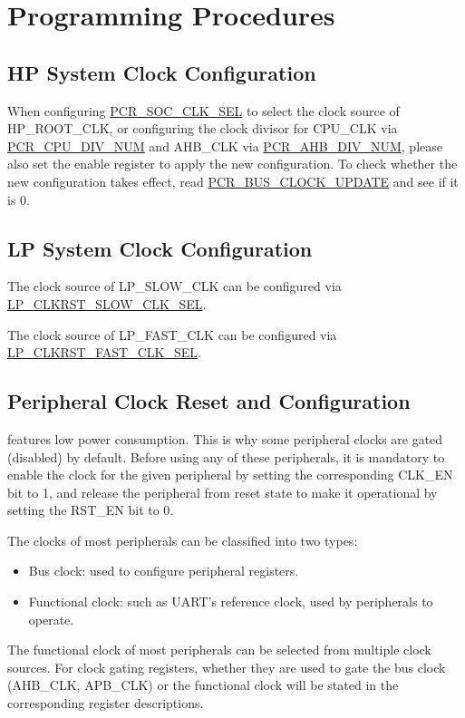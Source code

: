 \documentclass[main\_\_EN.tex]{subfiles}
\begin{document}
\section{Programming Procedures}
\label{sec:resclk-prog-procedures}

\subsection{HP System Clock Configuration}

When configuring \hyperref[fielddesc:PCRSOCCLKSEL]{PCR\_SOC\_CLK\_SEL} to select the clock source of HP\_ROOT\_CLK, or configuring the clock divisor for CPU\_CLK via \hyperref[fielddesc:PCRCPUDIVNUM]{PCR\_CPU\_DIV\_NUM} and AHB\_CLK via \hyperref[fielddesc:PCRAHBDIVNUM]{PCR\_AHB\_DIV\_NUM}, please also set the enable register to apply the new configuration. To check whether the new configuration takes effect, read \hyperref[fielddesc:PCRBUSCLOCKUPDATE]{PCR\_BUS\_CLOCK\_UPDATE} and see if it is 0.

\subsection{LP System Clock Configuration}

The clock source of LP\_SLOW\_CLK can be configured via  \hyperref[fielddesc:LPCLKRSTSLOWCLKSEL]{LP\_CLKRST\_SLOW\_CLK\_SEL}.

The clock source of LP\_FAST\_CLK can be configured via  \hyperref[fielddesc:LPCLKRSTFASTCLKSEL]{LP\_CLKRST\_FAST\_CLK\_SEL}.

\subsection{Peripheral Clock Reset and Configuration}\label{sec:resclk-periperal-clock-configuration}

\begin{importantlisting}
\vspace{-0.5em}

\chipname{} features low power consumption. This is why some peripheral clocks are gated (disabled) by default. Before using any of these peripherals, it is mandatory to enable the clock for the given peripheral by setting the corresponding CLK\_EN bit to 1, and release the peripheral from reset state to make it operational by setting the RST\_EN bit to 0.
\end{importantlisting}

The clocks of most peripherals can be classified into two types:
\begin{itemize}
    \item Bus clock: used to configure peripheral registers.
    \item Functional clock: such as UART's reference clock, used by peripherals to operate.
\end{itemize}
The functional clock of most peripherals can be selected from multiple clock sources. For clock gating registers, whether they are used to gate the bus clock (AHB\_CLK, APB\_CLK) or the functional clock will be stated in the corresponding register descriptions.
\end{document}
